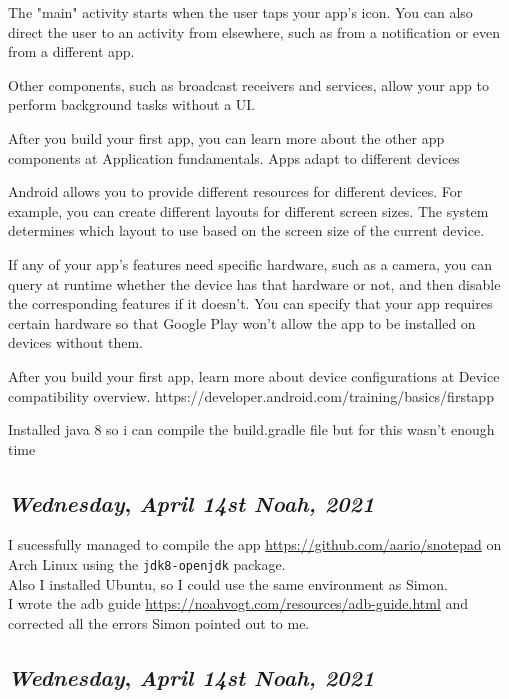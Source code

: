 The "main" activity starts when the user taps your app's icon. You can also direct the user to an activity from elsewhere, such as from a notification or even from a different app.

Other components, such as broadcast receivers and services, allow your app to perform background tasks without a UI.

After you build your first app, you can learn more about the other app components at Application fundamentals.
Apps adapt to different devices

Android allows you to provide different resources for different devices. For example, you can create different layouts for different screen sizes. The system determines which layout to use based on the screen size of the current device.

If any of your app's features need specific hardware, such as a camera, you can query at runtime whether the device has that hardware or not, and then disable the corresponding features if it doesn't. You can specify that your app requires certain hardware so that Google Play won't allow the app to be installed on devices without them.

After you build your first app, learn more about device configurations at Device compatibility overview. 
https://developer.android.com/training/basics/firstapp

Installed java 8 so i can compile the build.gradle file but for this wasn't enough time

\def\day{\textit{April 14st Noah, 2021}}
\def\weekday{\textit{Wednesday}}
\subsection*{\weekday, \day}

I sucessfully managed to compile the app \url{https://github.com/aario/snotepad} on Arch Linux using the \texttt{jdk8-openjdk} package.\\

Also I installed Ubuntu, so I could use the same environment as Simon.\\

I wrote the adb guide \url{https://noahvogt.com/resources/adb-guide.html} and corrected all the errors Simon pointed out to me.

\def\day{\textit{April 14st Noah, 2021}}
\def\weekday{\textit{Wednesday}}
\subsection*{\weekday, \day}

